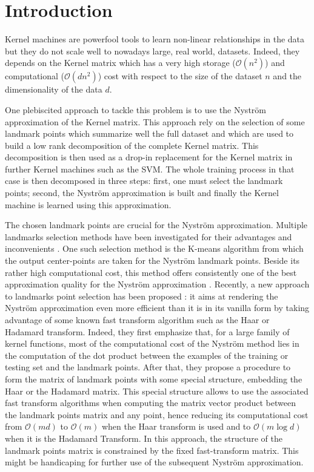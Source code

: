\section{Introduction}

Kernel machines are powerfool tools to learn non-linear relationships in the data but they do not scale well to nowadays large, real world, datasets. Indeed, they depends on the Kernel matrix which has a very high storage ($\mathcal{O}(n^2)$) and computational ($\mathcal{O}(dn^2)$) cost with respect to the size of the dataset $n$ and the dimensionality of the data $d$.

One plebiscited approach to tackle this problem is to use the Nyström approximation of the Kernel matrix. This approach rely on the selection of some landmark points which summarize well the full dataset and which are used to build a low rank decomposition of the complete Kernel matrix. This decomposition is then used as a drop-in replacement for the Kernel matrix in further Kernel machines such as the SVM. The whole training process in that case is then decomposed in three steps: first, one must select the landmark points; second, the Nyström approximation is built and finally the Kernel machine is learned using this approximation. 

The chosen landmark points are crucial for the Nyström approximation. Multiple landmarks selection methods have been investigated for their advantages and inconvenients \cite{kumar2012sampling}\cite{musco2017recursive}. One such selection method is the K-means algorithm from which the output center-points are taken for the Nyström landmark points. Beside its rather high computational cost, this method offers consistently one of the best approximation quality for the Nyström approximation \cite{kumar2012sampling}. Recently, a new approach to landmarks point selection has been proposed \cite{si2016computationally}: it aims at rendering the Nyström approximation even more efficient than it is in its vanilla form by taking advantage of some known fast transform algorithm such as the Haar or Hadamard transform. Indeed, they first emphasize that, for a large family of kernel functions, most of the computational cost of the Nyström method lies in the computation of the dot product between the examples of the training or testing set and the landmark points. After that, they propose a procedure to form the matrix of landmark points with some special structure, embedding the Haar or the Hadamard matrix. This special structure allows to use the associated fast transform algorithms when computing the matrix vector product between the landmark points matrix and any point, hence reducing its computational cost from $\mathcal{O}(md)$ to $\mathcal{O}(m)$ when the Haar transform is used and to $\mathcal{O}(m \log d)$ when it is the Hadamard Transform. In this approach, the structure of the landmark points matrix is constrained by the fixed fast-transform matrix. This might be handicaping for further use of the subsequent Nyström approximation.

